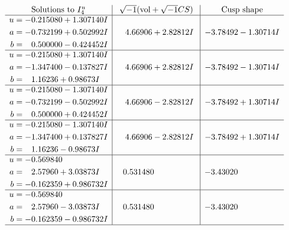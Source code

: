 \documentclass[1p]{elsarticle_modified}
\theoremstyle{definition}
\newcommand{\I}{\sqrt{-1}}
\begin{document}
$$\begin{array}{c|c|c}  
\text{Solutions to }I^u_{4}& \I (\text{vol} + \sqrt{-1}CS) & \text{Cusp shape}\\
 \hline 
\begin{aligned}
u &= -0.215080 + 1.307140 I \\
a &= -0.732199 + 0.502992 I \\
b &= \phantom{-}0.500000 - 0.424452 I\end{aligned}
 & \phantom{-}4.66906 + 2.82812 I & -3.78492 - 1.30714 I \\ \hline\begin{aligned}
u &= -0.215080 + 1.307140 I \\
a &= -1.347400 - 0.137827 I \\
b &= \phantom{-}1.16236 + 0.98673 I\end{aligned}
 & \phantom{-}4.66906 + 2.82812 I & -3.78492 - 1.30714 I \\ \hline\begin{aligned}
u &= -0.215080 - 1.307140 I \\
a &= -0.732199 - 0.502992 I \\
b &= \phantom{-}0.500000 + 0.424452 I\end{aligned}
 & \phantom{-}4.66906 - 2.82812 I & -3.78492 + 1.30714 I \\ \hline\begin{aligned}
u &= -0.215080 - 1.307140 I \\
a &= -1.347400 + 0.137827 I \\
b &= \phantom{-}1.16236 - 0.98673 I\end{aligned}
 & \phantom{-}4.66906 - 2.82812 I & -3.78492 + 1.30714 I \\ \hline\begin{aligned}
u &= -0.569840\phantom{ +0.000000I} \\
a &= \phantom{-}2.57960 + 3.03873 I \\
b &= -0.162359 + 0.986732 I\end{aligned}
 & \phantom{-}0.531480\phantom{ +0.000000I} & -3.43020\phantom{ +0.000000I} \\ \hline\begin{aligned}
u &= -0.569840\phantom{ +0.000000I} \\
a &= \phantom{-}2.57960 - 3.03873 I \\
b &= -0.162359 - 0.986732 I\end{aligned}
 & \phantom{-}0.531480\phantom{ +0.000000I} & -3.43020\phantom{ +0.000000I}\\
 \hline 
 \end{array}$$\newpage\newpage\renewcommand{\arraystretch}{1}
\end{document}
